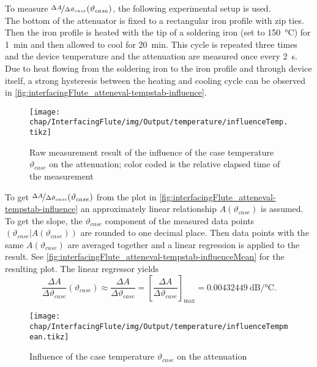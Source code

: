 To measure $\nicefrac{\Delta A}{\Delta \vartheta_{case}} (\vartheta_{case})$, the following experimental setup is used.\\
The bottom of the attenuator is fixed to a rectangular iron profile with zip ties. Then the iron profile is heated with the tip of a soldering iron (set to \SI{150}{\degreeCelsius}) for \SI{1}{\minute} and then allowed to cool for \SI{20}{\minute}. This cycle is repeated three times and the device temperature and the attenuation are measured once every \SI{2}{\second}. Due to heat flowing from the soldering iron to the iron profile and through device itself, a strong hysteresis between the heating and cooling cycle can be observed in \autoref{fig:interfacingFlute_atteneval-tempstab-influence}.

\begin{figure}[tb]
	\centering
	\texttt{[image: chap/InterfacingFlute/img/Output/temperature/influenceTemp.tikz]}
	\caption{Raw measurement result of the influence of the case temperature $\vartheta_{case}$ on the attenuation; color coded is the relative elapsed time of the measurement}
	\label{fig:interfacingFlute_atteneval-tempstab-influence}
\end{figure}

To get $\nicefrac{\Delta A}{\Delta \vartheta_{case}} (\vartheta_{case})$ from the plot in \autoref{fig:interfacingFlute_atteneval-tempstab-influence} an approximately linear relationship $A(\vartheta_{case})$ is assumed. To get the slope, the $\vartheta_{case}$ component of the measured data points $(\vartheta_{case}|A(\vartheta_{case}))$ are rounded to one decimal place. Then data points with the same $A(\vartheta_{case})$ are averaged together and a linear regression is applied to the result. See \autoref{fig:interfacingFlute_atteneval-tempstab-influenceMean} for the resulting plot. The linear regressor yields
\begin{equation}
\frac{\Delta A}{\Delta \vartheta_{case}} (\vartheta_{case})
\approx \frac{\Delta A}{\Delta \vartheta_{case}}
= \left[\frac{\Delta A}{\Delta \vartheta_{case}}\right]_\text{max}
= \SI{0.00432449}{\dB\per\celsius}.
\end{equation}

\begin{figure}[tb]
	\centering
	\texttt{[image: chap/InterfacingFlute/img/Output/temperature/influenceTempmean.tikz]}
	\caption{Influence of the case temperature $\vartheta_{case}$ on the attenuation}
	\label{fig:interfacingFlute_atteneval-tempstab-influenceMean}
\end{figure}

